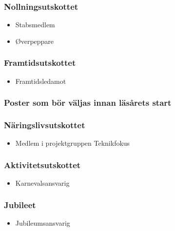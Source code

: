 \documentclass{dsekkallelse}
\begin{document}
\begin{multicols}{2}
\subsubsection{Nollningsutskottet}
\begin{itemize}
    \item Stabsmedlem
    \item Øverpeppare
\end{itemize}

\subsubsection{Framtidsutskottet}
\begin{itemize}
    \item Framtidsledamot 
\end{itemize}
\end{multicols}

\subsubsection{Poster som bör väljas innan läsårets start}

\begin{multicols}{2}
\subsubsection{Näringslivsutskottet}
\begin{itemize}
    \item Medlem i projektgruppen Teknikfokus
\end{itemize}

\subsubsection{Aktivitetsutskottet}
\begin{itemize}
    \item Karnevalsansvarig
\end{itemize}

\subsubsection{Jubileet}
\begin{itemize}
    \item Jubileumsansvarig
\end{itemize}

\end{multicols}
\end{document}
